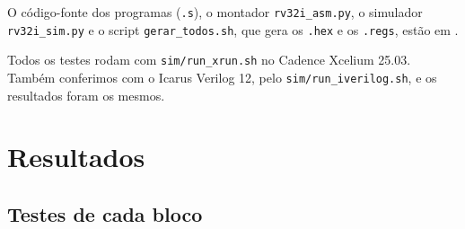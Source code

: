 \documentclass[11pt,a4paper]{article}
\begin{document}
O código-fonte dos programas (\texttt{.s}), o montador \texttt{rv32i\_asm.py}, o simulador
\texttt{rv32i\_sim.py} e o script \texttt{gerar\_todos.sh}, que gera os \texttt{.hex} e os
\texttt{.regs}, estão em .

Todos os testes rodam com \texttt{sim/run\_xrun.sh} no Cadence Xcelium 25.03. Também
conferimos com o Icarus Verilog 12, pelo \texttt{sim/run\_iverilog.sh}, e os resultados
foram os mesmos.

\section{Resultados}

\subsection{Testes de cada bloco}
\end{document}
